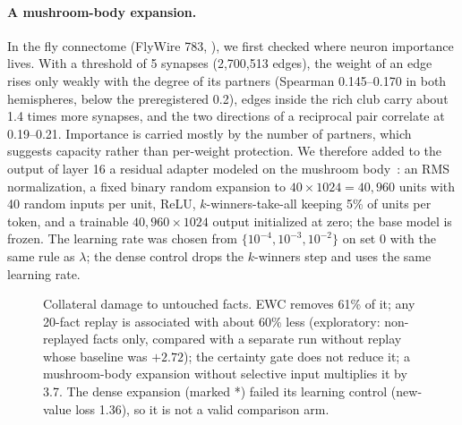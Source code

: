 \documentclass[11pt]{article}
\begin{document}
\paragraph{A mushroom-body expansion.}
In the fly connectome (FlyWire 783, \citealp{dorkenwald2024neuronal}), we first checked where neuron importance lives.
With a threshold of 5 synapses (2{,}700{,}513 edges), the weight of an edge rises only weakly with the degree of its partners (Spearman 0.145--0.170 in both hemispheres, below the preregistered 0.2), edges inside the rich club carry about 1.4 times more synapses, and the two directions of a reciprocal pair correlate at 0.19--0.21.
Importance is carried mostly by the number of partners, which suggests capacity rather than per-weight protection.
We therefore added to the output of layer 16 a residual adapter modeled on the mushroom body~\citep{shen2023reducing}: an RMS normalization, a fixed binary random expansion to $40\times1024=40{,}960$ units with 40 random inputs per unit, ReLU, $k$-winners-take-all keeping 5\% of units per token, and a trainable $40{,}960\times1024$ output initialized at zero; the base model is frozen.
The learning rate was chosen from $\{10^{-4},10^{-3},10^{-2}\}$ on set 0 with the same rule as $\lambda$; the dense control drops the $k$-winners step and uses the same learning rate.

\begin{figure}[t]
\centering
{}
\caption{Collateral damage to untouched facts. EWC removes 61\% of it; any 20-fact replay is associated with about 60\% less (exploratory: non-replayed facts only, compared with a separate run without replay whose baseline was $+2.72$); the certainty gate does not reduce it; a mushroom-body expansion without selective input multiplies it by 3.7. The dense expansion (marked *) failed its learning control (new-value loss 1.36), so it is not a valid comparison arm.}
\label{fig:collateral}
\end{figure}
\end{document}
